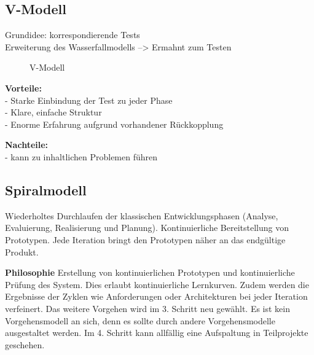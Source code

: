 \subsection{V-Modell}
Grundidee: korrespondierende Tests \\
Erweiterung des Wasserfallmodells --> Ermahnt zum Testen
\begin{figure}[ht]
	\centering
	\caption[]{V-Modell}
\end{figure}

\textbf{Vorteile:} \\
- Starke Einbindung der Test zu jeder Phase \\
- Klare, einfache Struktur \\
- Enorme Erfahrung aufgrund vorhandener Rückkopplung

\textbf{Nachteile:} \\
- kann zu inhaltlichen Problemen führen

\subsection{Spiralmodell}

Wiederholtes Durchlaufen der klassischen 
Entwicklungsphasen (Analyse, Evaluierung, Realisierung und Planung). Kontinuierliche Bereitstellung von 
Prototypen. Jede Iteration bringt den Prototypen näher 
an das endgültige Produkt. 

\textbf{Philosophie}
Erstellung von kontinuierlichen Prototypen und kontinuierliche Prüfung des System. Dies erlaubt kontinuierliche Lernkurven. Zudem werden die Ergebnisse der Zyklen wie Anforderungen oder Architekturen bei jeder Iteration verfeinert. Das weitere Vorgehen wird im 3. Schritt neu gewählt. Es ist kein Vorgehensmodell an sich, denn es sollte durch andere Vorgehensmodelle ausgestaltet werden. Im 4. Schritt kann allfällig eine Aufspaltung in Teilprojekte geschehen. 

